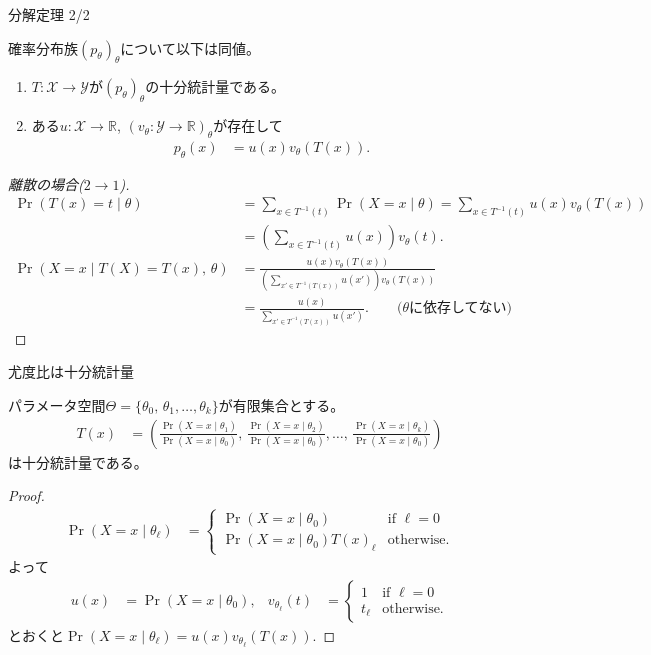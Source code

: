 \documentclass[lualatex,handout]{beamer}
\theoremstyle{definition}
\begin{document}
\begin{frame}{分解定理 2/2}
\footnotesize
\begin{theorem}
確率分布族$(p_\theta)_\theta$について以下は同値。
\begin{enumerate}
\item $T\colon\mathcal{X}\to\mathcal{Y}$が$(p_\theta)_\theta$の十分統計量である。
\item ある$u\colon\mathcal{X}\to\mathbb{R}$, $(v_\theta\colon \mathcal{Y}\to\mathbb{R})_\theta$が存在して
\begin{align*}
p_\theta(x) &= u(x) v_\theta(T(x)).
\end{align*}
\end{enumerate}
\end{theorem}
\begin{proof}[\small 離散の場合($2\to 1$)]

\vspace{-1em}
\begin{align*}
\Pr(T(x)=t\mid\theta)&=\sum_{x\in T^{-1}(t)} \Pr(X=x\mid \theta)
=\sum_{x\in T^{-1}(t)} u(x)v_\theta(T(x))\\
&=\left(\sum_{x\in T^{-1}(t)} u(x)\right)v_\theta(t).\\
\Pr(X=x\mid T(X)=T(x),\, \theta)&=\frac{u(x)v_\theta(T(x))}{\left(\sum_{x'\in T^{-1}(T(x))} u(x')\right)v_\theta(T(x))}\\
&=\frac{u(x)}{\sum_{x'\in T^{-1}(T(x))} u(x')}. \qquad\text{($\theta$に依存してない)}
\end{align*}
\end{proof}
\end{frame}

\begin{frame}{尤度比は十分統計量}
\small
\begin{lemma}
パラメータ空間$\Theta=\{\theta_0,\,\theta_1,\dotsc,\theta_k\}$が有限集合とする。
\begin{align*}
T(x) &= \left(\frac{\Pr(X=x\mid\theta_1)}{\Pr(X=x\mid\theta_0)},\, \frac{\Pr(X=x\mid\theta_2)}{\Pr(X=x\mid\theta_0)},\dotsc,\,\frac{\Pr(X=x\mid\theta_k)}{\Pr(X=x\mid\theta_0)}\right)
\end{align*}
は十分統計量である。
\end{lemma}
\begin{proof}
\vspace{-1em}
\begin{align*}
\Pr(X=x\mid\theta_\ell)&=
\begin{cases}
\Pr(X=x\mid\theta_0)&\text{if } \ell = 0\\
\Pr(X=x\mid\theta_0) T(x)_\ell&\text{otherwise.}
\end{cases}
\end{align*}
よって
\begin{align*}
u(x) &= \Pr(X=x\mid\theta_0),&
v_{\theta_\ell}(t) &=
\begin{cases}
1&\text{if } \ell = 0\\
t_\ell&\text{otherwise.}
\end{cases}
\end{align*}
とおくと$\Pr(X=x\mid\theta_\ell)=u(x)v_{\theta_\ell}(T(x))$.
\end{proof}
\end{frame}
\end{document}

